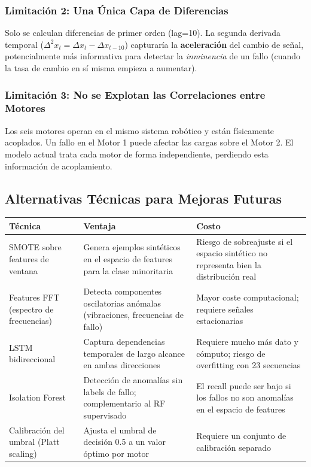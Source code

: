 \documentclass[12pt,a4paper]{article}
\begin{document}
\subsubsection{Limitaci\'{o}n 2: Una \'{U}nica Capa de Diferencias}

Solo se calculan diferencias de primer orden (lag=10). La segunda derivada temporal
($\Delta^2 x_t = \Delta x_t - \Delta x_{t-10}$) capturar\'{i}a la \textbf{aceleraci\'{o}n}
del cambio de se\~{n}al, potencialmente m\'{a}s informativa para detectar la \textit{inminencia}
de un fallo (cuando la tasa de cambio en s\'{i} misma empieza a aumentar).

\subsubsection{Limitaci\'{o}n 3: No se Explotan las Correlaciones entre Motores}

Los seis motores operan en el mismo sistema rob\'{o}tico y est\'{a}n f\'{i}sicamente acoplados.
Un fallo en el Motor 1 puede afectar las cargas sobre el Motor 2. El modelo actual
trata cada motor de forma independiente, perdiendo esta informaci\'{o}n de acoplamiento.

\subsection{Alternativas T\'{e}cnicas para Mejoras Futuras}

\begin{center}
\begin{tabular}{p{3.5cm}p{5cm}p{4cm}}
\toprule
\textbf{T\'{e}cnica} & \textbf{Ventaja} & \textbf{Costo} \\
\midrule
SMOTE sobre features de ventana &
  Genera ejemplos sint\'{e}ticos en el espacio de features para la clase minoritaria &
  Riesgo de sobreajuste si el espacio sintético no representa bien la distribución real \\
\addlinespace
Features FFT (espectro de frecuencias) &
  Detecta componentes oscilatorias anómalas (vibraciones, frecuencias de fallo) &
  Mayor coste computacional; requiere señales estacionarias \\
\addlinespace
LSTM bidireccional &
  Captura dependencias temporales de largo alcance en ambas direcciones &
  Requiere mucho más dato y cómputo; riesgo de overfitting con 23 secuencias \\
\addlinespace
Isolation Forest &
  Detecci\'{o}n de anomalías sin labels de fallo; complementario al RF supervisado &
  El recall puede ser bajo si los fallos no son anomalías en el espacio de features \\
\addlinespace
Calibraci\'{o}n del umbral (Platt scaling) &
  Ajusta el umbral de decisi\'{o}n 0.5 a un valor \'{o}ptimo por motor &
  Requiere un conjunto de calibraci\'{o}n separado \\
\bottomrule
\end{tabular}
\end{center}
\end{document}
